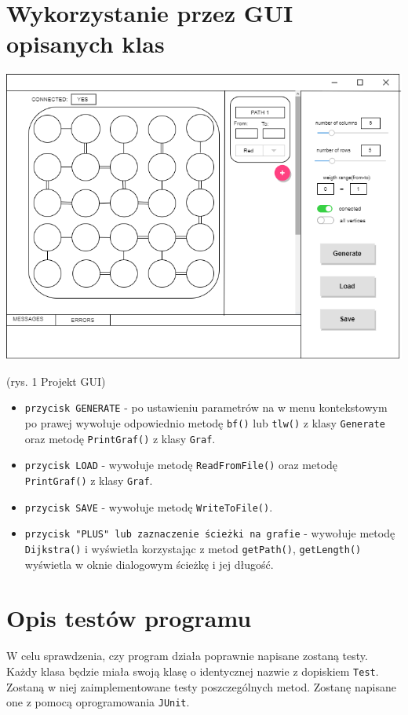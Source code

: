\documentclass[]{article}
\begin{document}
\section{Wykorzystanie przez GUI opisanych klas}\label{header-n281}
\begin{center}
\includegraphics[scale=0.3]{gui_jimp.drawio}
\end{center}
\begin{center}
(rys. 1 Projekt GUI)
\end{center}
\begin{itemize}
\item
\texttt{przycisk GENERATE} - po ustawieniu parametrów na w menu kontekstowym po prawej wywołuje odpowiednio metodę \texttt{bf()} lub \texttt{tlw()} z klasy \texttt{Generate} oraz metodę \texttt{PrintGraf()} z klasy \texttt{Graf}.
\item
\texttt{przycisk LOAD} - wywołuje metodę \texttt{ReadFromFile()} oraz metodę \texttt{PrintGraf()} z klasy \texttt{Graf}.
\item
\texttt{przycisk SAVE} - wywołuje metodę \texttt{WriteToFile()}.
\item
\texttt{przycisk "PLUS" lub zaznaczenie ścieżki na grafie} - wywołuje metodę \texttt{Dijkstra()} i wyświetla korzystając z metod \texttt{getPath()}, \texttt{getLength()} wyświetla w oknie dialogowym ścieżkę i jej długość.

\end{itemize} 


\section{Opis testów programu}\label{header-n281}
W celu sprawdzenia, czy program działa poprawnie napisane zostaną testy. Każdy klasa będzie miała swoją klasę o identycznej nazwie z dopiskiem \texttt{Test}. Zostaną w niej zaimplementowane testy poszczególnych metod. Zostanę napisane one z pomocą oprogramowania \texttt{JUnit}. 
\end{document}
